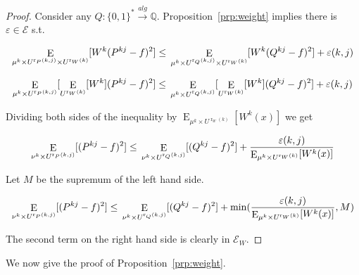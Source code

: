 \documentclass{article}
\theoremstyle{definition}
\theoremstyle{plain}
\newcommand{\Words}{{\{ 0, 1 \}^*}}
\DeclareMathOperator{\E}{E}
\DeclareMathOperator{\R}{r}
\newcommand{\Rats}{\mathbb{Q}}
\begin{document}
\begin{proof}

Consider any $Q: \Words \xrightarrow{alg} \Rats$. Proposition~\ref{prp:weight} implies there is $\varepsilon \in \mathcal{E}$ s.t.

$$\E_{\mu^k \times U^{\R_P(k,j)} \times U^{\R_W(k)}}[W^k(P^{kj} - f)^2] \leq \\ \E_{\mu^k \times U^{\R_Q(k,j)} \times U^{\R_W(k)}}[W^k(Q^{kj} - f)^2] + \varepsilon(k,j)$$

$$\E_{\mu^k \times U^{\R_P(k,j)}}[\E_{U^{\R_W(k)}}[W^k](P^{kj} - f)^2] \leq \\ \E_{\mu^k \times U^{\R_Q(k,j)}}[\E_{U^{\R_W(k)}}[W^k](Q^{kj} - f)^2] + \varepsilon(k,j)$$

Dividing both sides of the inequality by $\E_{\mu^k \times U^{\R_W(k)}}[W^k(x)]$ we get

$$\E_{\nu^k \times U^{\R_P(k,j)}}[(P^{kj} - f)^2] \leq \\ \E_{\nu^k \times U^{\R_Q(k,j)}}[(Q^{kj} - f)^2] + \frac{\varepsilon(k,j)}{\E_{\mu^k \times U^{\R_W(k)}}[W^k(x)]}$$

Let $M$ be the supremum of the left hand side.

$$\E_{\nu^k \times U^{\R_P(k,j)}}[(P^{kj} - f)^2] \leq \\ \E_{\nu^k \times U^{\R_Q(k,j)}}[(Q^{kj} - f)^2] + \min(\frac{\varepsilon(k,j)}{\E_{\mu^k \times U^{\R_W(k)}}[W^k(x)]},M)$$

The second term on the right hand side is clearly in $\mathcal{E}_W$.

\end{proof}

We now give the proof of Proposition~\ref{prp:weight}.
\end{document}

